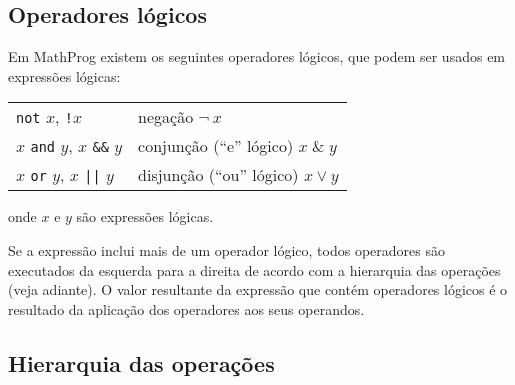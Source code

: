 \documentclass[11pt, brazil]{report}
\begin{document}
\newpage

\subsection{Operadores lógicos}

Em MathProg existem os seguintes operadores lógicos, que podem ser usados em
expressões lógicas:


\begin{tabular}{@{}ll@{}}
{\tt not} $x$, {\tt!}$x$&negação $\neg\ x$\\
$x$ {\tt and} $y$, $x$ {\tt\&\&} $y$&conjunção (``e'' lógico)
$x\;\&\;y$\\
$x$ {\tt or} $y$, $x$ {\tt||} $y$&disjunção (``ou'' lógico)
$x\vee y$\\
\end{tabular}


\noindent onde $x$ e $y$ são expressões lógicas.

Se a expressão inclui mais de um operador lógico, todos operadores
são executados da esquerda para a direita de acordo com a hierarquia
das operações (veja adiante). O valor resultante da \linebreak expressão
que contém operadores lógicos é o resultado da aplicação dos
operadores aos seus \linebreak operandos.

%

\subsection{Hierarquia das operações}
\end{document}
